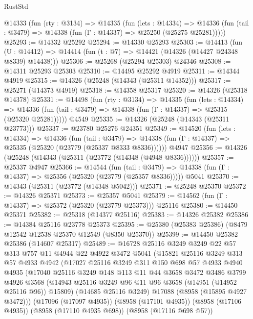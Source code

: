 \begin{lexlean}{RustStd}
\begin{coremodule}
  @14333
    (fun (rty : @3134) =>
    @14335
      (fun (lets : @14334) =>
      @14336 (fun (tail : @3479) => @14338 (fun (Γ : @14337) => @25250 (@25275 @25281)))))
@25293 := @14332 @25292
@25294 := @14330 @25293
@25303 := @14413
    (fun (U : @14412) => @14414 (fun (t : @7) => @14421 (@14326 (@14427 @24348 @8339) @14438)))
@25306 := @25268 (@25294 @25303) @24346
@25308 := @14311 @25293 @25303
@25310 := @14495 @25292 @4919
@25311 := @14344 @4919
@25315 := @14326 (@25248 (@14343 (@25311 @14352)))
@25317 := @25271 (@14373 @4919)
@25318 := @14358 @25317
@25320 := @14326 (@25318 @14378)
@25331 := @14498
    (fun (rty : @3134) =>
    @14335
      (fun (lets : @14334) =>
      @14336 (fun (tail : @3479) => @14338 (fun (Γ : @14337) => @25315 (@25320 @25281)))))
    @4549
@25335 := @14326 (@25248 (@14343 (@25311 @23773)))
@25337 := @23780 @25276 @24351
@25349 := @14520
    (fun (lets : @14334) =>
    @14336
      (fun (tail : @3479) =>
      @14338 (fun (Γ : @14337) => @25335 (@25320 (@23779 (@25337 @8333 @8336))))))
    @4947
@25356 := @14326 (@25248 (@14343 (@25311 (@23772 (@14348 (@4948 @8336))))))
@25357 := @25337 @4947
@25366 := @14544
    (fun (tail : @3479) => @14338 (fun (Γ : @14337) => @25356 (@25320 (@23779 (@25357 @8336)))))
    @5041
@25370 := @14343 (@25311 (@23772 (@14348 @5042)))
@25371 := @25248 @25370
@25372 := @14326 @25371
@25373 := @25357 @5041
@25379 := @14562 (fun (Γ : @14337) => @25372 (@25320 (@23779 @25373))) @25116
@25380 := @14450 @25371
@25382 := @25318 (@14377 @25116)
@25383 := @14326 @25382
@25386 := @14384 @25116 @23778 @25373
@25395 := @25380 (@25383 @25386) (@8479 @12542 @12538 @25370 @12549 (@8350 @25370))
@25399 := @14450 @25382 @25386 (@14607 @25317)
@25489 := @16728
    @25116
    @3249
    @3249
    @22
    @57
    @313
    @757
    @11
    @4944
    @22
    @4922
    @3472
    @5041
    (@15821
      @25116
      @3249
      @313
      @57
      @4933
      @4942
      (@17027
        @25116
        @3249
        @311
        @150
        @698
        @57
        @4933
        @4940
        @4935
        (@17040
          @25116
          @3249
          @148
          @113
          @11
          @44
          @3658
          @3472
          @3486
          @3799
          @4926
          @3568
          (@14943 @25116 @3249 @96 @11 @96 @3658 (@14951 (@14952 @25116 @96)) @15809)
          (@14685 @25116 @3249)
          @17088
          (@8958 (@15895 @4927 @3472)))
        (@17096 (@17097 @4935))
        (@8958 (@17101 @4935))
        (@8958 (@17106 @4935))
        (@8958 (@17110 @4935 @698))
        (@8958 (@17116 @698 @57))

\end{coremodule}
\end{lexlean}
